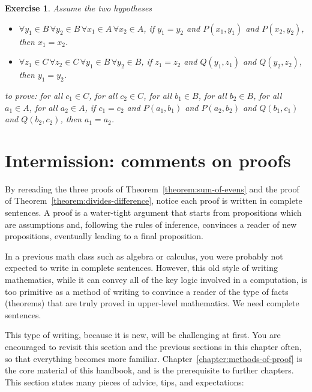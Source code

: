 \documentclass{book}
\newcounter{ekcounter}%
\theoremstyle{ekimcustom}
\newtheorem{example}[ekcounter]{Example}
\newtheorem{exercise}[ekcounter]{Exercise}
\begin{document}
\begin{exercise} %
Assume the two hypotheses
\begin{itemize}
\item $\forall y_1 \in B\, \forall y_2 \in B\, \forall x_1 \in A\, \forall x_2 \in A$, if $y_1=y_2$ and $P(x_1,y_1)$ and $P(x_2,y_2)$, then $x_1=x_2$.
\item $\forall z_1 \in C\, \forall z_2 \in C\, \forall y_1 \in B\, \forall y_2 \in B$, if $z_1=z_2$ and $Q(y_1,z_1)$ and $Q(y_2,z_2)$, then $y_1=y_2$.
\end{itemize}
to prove: for all $c_1 \in C$, for all $c_2 \in C$, for all $b_1 \in B$, for all $b_2 \in B$, for all $a_1 \in A$, for all $a_2 \in A$, if $c_1=c_2$ and $P(a_1,b_1)$ and $P(a_2,b_2)$ and $Q(b_1,c_1)$ and $Q(b_2,c_2)$, then $a_1=a_2$.
\end{exercise}




\section{Intermission: comments on proofs}

By rereading the three proofs of Theorem~\ref{theorem:sum-of-evens} and the proof of Theorem~\ref{theorem:divides-difference}, notice each proof is written in complete sentences. A proof is a water-tight argument that starts from propositions which are assumptions and, following the rules of inference, convinces a reader of new propositions, eventually leading to a final proposition.

In a previous math class such as algebra or calculus, you were probably not expected to write in complete sentences. However, this old style of writing mathematics, while it can convey all of the key logic involved in a computation, is too primitive as a method of writing to convince a reader of the type of facts (theorems) that are truly proved in upper-level mathematics. We need complete sentences.

This type of writing, because it is new, will be challenging at first. You are encouraged to revisit this section and the previous sections in this chapter often, so that everything becomes more familiar. Chapter~\ref{chapter:methods-of-proof} is the core material of this handbook, and is the prerequisite to further chapters.
This section states many pieces of advice, tips, and expectations:
\end{document}
